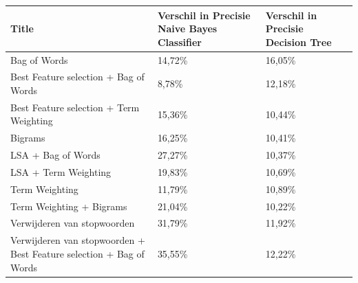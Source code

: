 \begin{table}[h]
\centering
\begin{adjustbox}{width=1\textwidth}
\begin{tabular}{|l|l|l|}
\hline
{\bf Title}                                                                          & {\bf Verschil in Precisie Naive Bayes Classifier} & {\bf Verschil in Precisie Decision Tree} \\ \hline
Bag of Words                                                                         & 14,72\%                                           & 16,05\%                                  \\ \hline
Best Feature selection + Bag of Words                                                  & 8,78\%                                            & 12,18\%                                  \\ \hline
Best Feature selection + Term Weighting                                      & 15,36\%                                           & 10,44\%                                  \\ \hline
Bigrams                                                                   & 16,25\%                                           & 10,41\%                                  \\ \hline
LSA + Bag of Words                                                                  & 27,27\%                                           & 10,37\%                                  \\ \hline
LSA + Term Weighting                                                          & 19,83\%                                           & 10,69\%                                  \\ \hline
Term Weighting                                                                       & 11,79\%                                           & 10,89\%                                  \\ \hline
Term Weighting + Bigrams                                                             & 21,04\%                                           & 10,22\%                                  \\ \hline
Verwijderen van stopwoorden                                                          & 31,79\%                                           & 11,92\%                                  \\ \hline
Verwijderen van stopwoorden + Best Feature selection + Bag of Words & 35,55\%                                           & 12,22\%                                  \\ \hline

\end{tabular}
\end{adjustbox}
\end{table}
